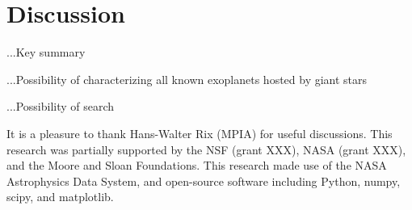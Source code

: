 \documentclass[12pt, preprint]{aastex}
\begin{document}
\section{Discussion}

...Key summary

...Possibility of characterizing all known exoplanets hosted by giant stars

...Possibility of search

\acknowledgements
It is a pleasure to thank
  Hans-Walter Rix (MPIA)
for useful discussions.
This research was partially supported by the NSF (grant XXX), NASA
(grant XXX), and the Moore and Sloan Foundations.
This research made use of the NASA Astrophysics Data System, and
open-source software including Python, numpy, scipy, and matplotlib.
\end{document}
